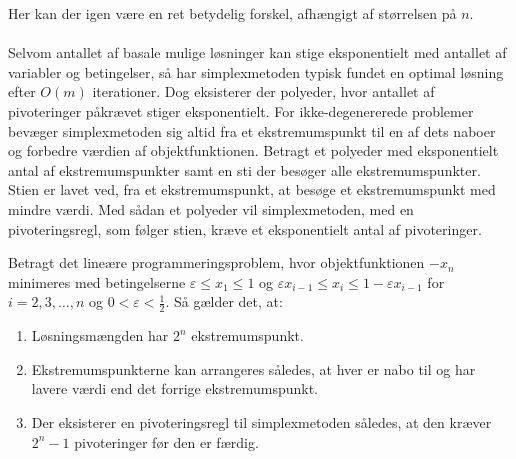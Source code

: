 Her kan der igen være en ret betydelig forskel, afhængigt af størrelsen på $n$.\\\\
%
Selvom antallet af basale mulige løsninger kan stige eksponentielt med antallet af variabler og betingelser, så har simplexmetoden typisk fundet en optimal løsning efter $O(m)$ iterationer.
Dog eksisterer der polyeder, hvor antallet af pivoteringer påkrævet stiger eksponentielt.
For ikke-degenererede problemer bevæger simplexmetoden sig altid fra et ekstremumspunkt til en af dets naboer og forbedre værdien af objektfunktionen.
Betragt et polyeder med eksponentielt antal af ekstremumspunkter samt en sti der besøger alle ekstremumspunkter.
Stien er lavet ved, fra et ekstremumspunkt, at besøge et ekstremumspunkt med mindre værdi.
Med sådan et polyeder vil simplexmetoden, med en pivoteringsregl, som følger stien, kræve et eksponentielt antal af pivoteringer.
\begin{thm}{}{}
Betragt det lineære programmeringsproblem, hvor objektfunktionen $-x_n$ minimeres med betingelserne $\varepsilon \leq x_1 \leq 1$ og $\varepsilon x_{i-1} \leq x_i \leq 1 - \varepsilon x_{i-1}$ for $i = 2, 3, \ldots, n$ og $0 < \varepsilon < \frac{1}{2}$.
Så gælder det, at:
%
\begin{enumerate}[label=(\alph*)]
\item Løsningsmængden har $2^n$ ekstremumspunkt.
\item Ekstremumspunkterne kan arrangeres således, at hver er nabo til og har lavere værdi end det forrige ekstremumspunkt.
\item Der eksisterer en pivoteringsregl til simplexmetoden således, at den kræver $2^n-1$ pivoteringer før den er færdig.
\end{enumerate}
%
\end{thm}
%
